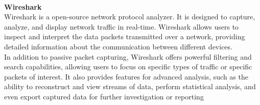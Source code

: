 \\
\textbf{Wireshark}\\
Wireshark is a open-source network protocol analyzer.
It is designed to capture, analyze, and display network traffic in real-time.
Wireshark allows users to inspect and interpret the data packets transmitted over a network, providing detailed information
about the communication between different devices.\\
In addition to passive packet capturing, Wireshark offers powerful filtering and search capabilities,
allowing users to focus on specific types of traffic or specific packets of interest.
It also provides features for advanced analysis, such as the ability to reconstruct and view streams of data,
perform statistical analysis, and even export captured data for further investigation or reporting